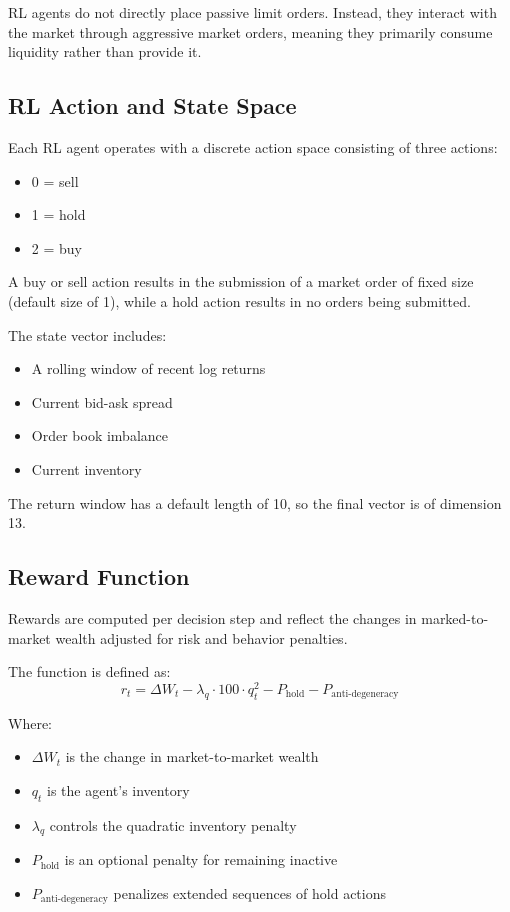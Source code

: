 \documentclass[11pt]{article}
\begin{document}
RL agents do not directly place passive limit orders. Instead, they interact with the market through aggressive market orders, meaning they primarily consume liquidity rather than provide it.

\subsection{RL Action and State Space}

Each RL agent operates with a discrete action space consisting of three actions:
\begin{itemize}[leftmargin=2em]
    \item 0 = sell
    \item 1 = hold
    \item 2 = buy
\end{itemize}

A buy or sell action results in the submission of a market order of fixed size (default size of 1), while a hold action results in no orders being submitted.

The state vector includes:
\begin{itemize}[leftmargin=2em]
    \item A rolling window of recent log returns
    \item Current bid-ask spread
    \item Order book imbalance
    \item Current inventory
\end{itemize}

The return window has a default length of 10, so the final vector is of dimension 13.

\subsection{Reward Function}

Rewards are computed per decision step and reflect the changes in marked-to-market wealth adjusted for risk and behavior penalties.

The function is defined as:
\[
r_t = \Delta W_t - \lambda_q \cdot 100 \cdot q_t^2 - P_{\text{hold}} - P_{\text{anti-degeneracy}}
\]

Where:
\begin{itemize}[leftmargin=2em]
    \item $\Delta W_t$ is the change in market-to-market wealth
    \item $q_t$ is the agent’s inventory
    \item $\lambda_q$ controls the quadratic inventory penalty
    \item $P_{\text{hold}}$ is an optional penalty for remaining inactive
    \item $P_{\text{anti-degeneracy}}$ penalizes extended sequences of hold actions
\end{itemize}
\end{document}

